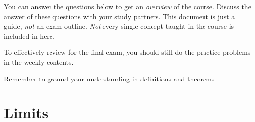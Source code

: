 \documentclass[../main.tex]{subfiles}
\begin{document}

You can answer the questions below to get an \emph{overview} of the course. Discuss the answer of these questions with your study partners. This document is just a guide, \emph{not} an exam outline. \emph{Not} every single concept taught in the course is included in here. 

To effectively review for the final exam, you should still do the practice problems in the weekly contents. 

Remember to ground your understanding in definitions and theorems.

\section{Limits}
\end{document}
